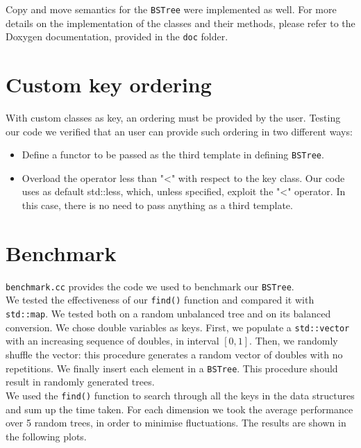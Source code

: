 \documentclass[12pt,a4paper,openany]{scrartcl}
\begin{document}
	\noindent Copy and move semantics for the \texttt{BSTree} were implemented as well. For more details on the implementation of the classes and their methods, please refer to the Doxygen documentation, provided in the \texttt{doc} folder.
	
\section{Custom key ordering}
	With custom classes as key, an ordering must be provided by the user. Testing our code we verified that an user can provide such ordering in two different ways:
		
	\begin{itemize}
		\item Define a functor to be passed as the third template in defining \texttt{BSTree}.
		\item Overload the operator less than "<" with respect to the key class. Our code uses as default std::less, which, unless specified, exploit the "<" operator. In this case, there is no need to pass anything as a third template.
	\end{itemize}
	
	
	\section{Benchmark}
	\texttt{benchmark.cc} provides the code we used to benchmark our \texttt{BSTree}.\\
	We tested the effectiveness of our \texttt{find()} function and compared it with \texttt{std::map}. We tested both on a random unbalanced tree and on its balanced conversion. We chose double variables as keys. First, we populate a \texttt{std::vector} with an increasing sequence of doubles, in interval $[0,1]$. Then, we randomly shuffle the vector: this procedure generates a random vector of doubles with no repetitions. We finally insert each element in a \texttt{BSTree}. This procedure should result in randomly generated trees.\\
	
	\noindent We used the \texttt{find()} function to search through all the keys in the data structures and sum up the time taken. For each dimension we took the average performance over 5 random trees, in order to minimise fluctuations. The results are shown in the following plots.
	
\end{document}
